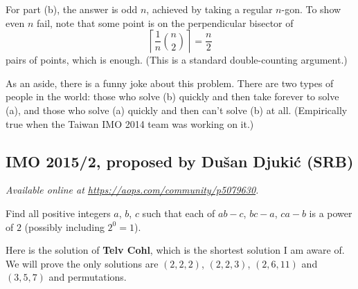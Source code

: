 \documentclass[11pt]{scrartcl}
\begin{document}
For part (b), the answer is odd $n$, achieved by taking a regular $n$-gon.
To show even $n$ fail, note that some point is on the perpendicular bisector of
\[ \left\lceil \frac 1n \binom n2 \right\rceil = \frac{n}{2} \]
pairs of points, which is enough.
(This is a standard double-counting argument.)

As an aside, there is a funny joke about this problem.
There are two types of people in the world:
those who solve (b) quickly and then take forever to solve (a),
and those who solve (a) quickly and then can't solve (b) at all.
(Empirically true when the Taiwan IMO 2014 team was working on it.)
\pagebreak

\subsection{IMO 2015/2, proposed by Dušan Djukić (SRB)}
\textsl{Available online at \url{https://aops.com/community/p5079630}.}
\begin{mdframed}[style=mdpurplebox,frametitle={Problem statement}]
Find all positive integers $a$, $b$, $c$ such that
each of $ab-c$, $bc-a$, $ca-b$ is a power of $2$
(possibly including $2^0=1$).
\end{mdframed}
Here is the solution of \textbf{Telv Cohl},
which is the shortest solution I am aware of.
We will prove the only solutions are $(2,2,2)$, $(2,2,3)$,
$(2,6,11)$ and $(3,5,7)$ and permutations.
\end{document}
